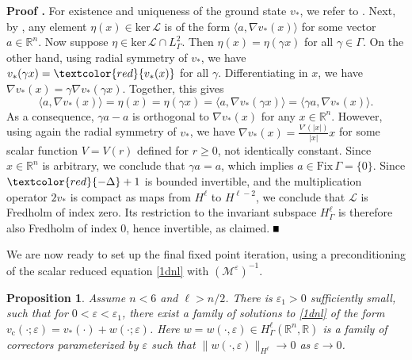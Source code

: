 \documentclass[10pt]{article}
\newtheorem{Proposition}[Lemma]{Proposition}
\newenvironment{Proof}[1][\unskip]%
 {\begin{trivlist} \item[]{\bf Proof #1. }}%
 {\hspace*{\fill}$\rule{.4\baselineskip}{.4\baselineskip}$\end{trivlist}}
\newcommand{\R}{\mathbb{R}}
\newcommand{\Ns}{\mathrm{ker\,}}
\newcommand{\eps}{\varepsilon}
\newcommand{\cL}{\mathcal{L}}
\newcommand{\M}{\mathcal{M}}
\begin{document}
\begin{Proof} 
For existence and uniqueness of the ground state $v_*$, we refer to \cite[Lem. 13.3]{gs}. Next, by \cite[Lem. 13.4]{gs}, any element $\eta(x) \in \Ns \cL$ is of the form $\langle a, \nabla v_*(x)\rangle$ for some vector $a \in \R^n$. Now suppose $\eta \in \Ns \cL \cap L^2_{\Gamma}$. Then  $\eta(x) = \eta(\gamma x)$ for all $\gamma \in \Gamma$.
On the other hand, using radial symmetry of $v_*$, we have $v_*(\gamma x) =\textcolor{red}{v_*(x)}$ for all $\gamma$.  Differentiating in $x$, we have $\nabla v_* (x) = \gamma \nabla v_* (\gamma x)$. Together, this gives
\[
\langle a,\nabla v_*(x) \rangle = \eta(x) = \eta(\gamma x) = \langle a, \nabla v_* (\gamma x)\rangle = \langle  \gamma a, \nabla v_*(x)\rangle. 
\]
As a consequence,  $\gamma a - a$ is orthogonal to $\nabla v_*(x)$ for any $x \in \R^n$. However, using again the radial symmetry of $v_*$, we have $\nabla v_*(x)  = \frac{V'(|x|)}{|x|} x$ for some scalar function $V=V(r)$ defined for $r\ge 0$, not identically constant. Since $x \in \R^n$ is arbitrary, we conclude that $\gamma a =a$, which implies $a \in \mathrm{Fix}\,\Gamma = \{0\}$. Since $\textcolor{red}{-\Delta} +1$ is bounded invertible, and the multiplication operator $2v_*$ is compact as  maps from $H^\ell$ to $H^{\ell-2}$, we conclude that $\cL$ is Fredholm of index zero. Its restriction to the invariant subspace $H^\ell_\Gamma$ is therefore also Fredholm of index 0, hence invertible, as claimed. 
\end{Proof}

We are now ready to  set up the final fixed point iteration, using a preconditioning of the scalar reduced equation \eqref{1dnl} with $(\M^\eps)^{-1}$. 
\begin{Proposition}\label{prop} Assume $n<6$ and $\ell>n/2$. There is $\eps_1>0$ sufficiently small, such that for $0<\eps <\eps_1$, there exist a family of solutions to \eqref{1dnl} of the form $v_\mathrm{c}(\cdot;\eps) = v_*(\cdot)+w(\cdot; \eps)$. Here $w=w(\cdot,\eps) \in H^{\ell}_{\Gamma}(\R^n,\R)$ is a family of correctors parameterized by $\eps $ such that $\|w(\cdot,\eps)\|_{H^\ell} \to 0$ as $\eps \to 0$.
\end{Proposition}

\end{document}
